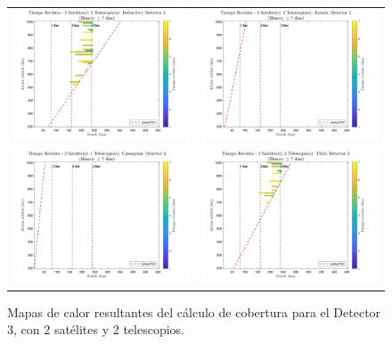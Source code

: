 \begin{landscape}
\begin{figure}[p]
\centering
\vspace*{0.3cm}
\setlength{\tabcolsep}{4pt}
\renewcommand{\arraystretch}{0}
\begin{tabular}{cc}
\includegraphics[width=0.48\linewidth]{4.Payload/Coverage/heatmap_2 Satelite(s); 2 Telescopio(s): Refractivo; Detector 3.jpg} &
\includegraphics[width=0.48\linewidth]{4.Payload/Coverage/heatmap_2 Satelite(s); 2 Telescopio(s): Korsch; Detector 3.jpg} \\
\includegraphics[width=0.48\linewidth]{4.Payload/Coverage/heatmap_3 Satelite(s); 1 Telescopio(s): Cassegrain; Detector 3.jpg} &
\includegraphics[width=0.48\linewidth]{4.Payload/Coverage/heatmap_2 Satelite(s); 2 Telescopio(s): TMA; Detector 3.jpg} \\
\end{tabular}
\caption{Mapas de calor resultantes del cálculo de cobertura para el Detector 3, con 2 satélites y 2 telescopios.}
\end{figure}
\end{landscape}


